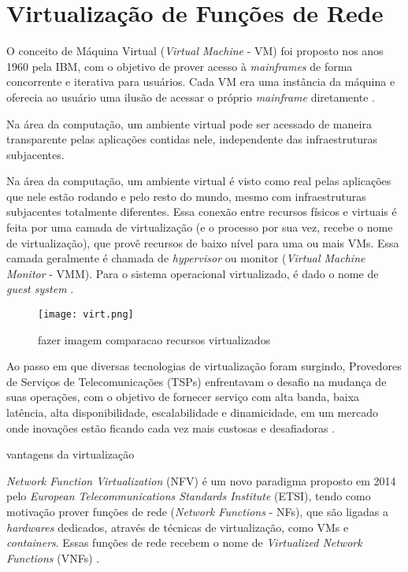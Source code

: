 \section{Virtualização de Funções de Rede}
\label{nfv}

O conceito de Máquina Virtual (\textit{Virtual Machine} - VM) foi proposto nos anos 1960 pela IBM, com o objetivo de prover acesso à \textit{mainframes} de forma concorrente e iterativa para usuários. Cada VM era uma instância da máquina e oferecia ao usuário uma ilusão de acessar o próprio \textit{mainframe} diretamente \cite{nanda2005survey}.

Na área da computação, um ambiente virtual pode ser acessado de maneira transparente pelas aplicações contidas nele, independente das infraestruturas subjacentes.

Na área da computação, um ambiente virtual é visto como real pelas aplicações que nele estão rodando e pelo resto do mundo, mesmo com infraestruturas subjacentes totalmente diferentes. Essa conexão entre recursos físicos e virtuais é feita por uma camada de virtualização (e o processo por sua vez, recebe o nome de virtualização), que provê recursos de baixo nível para uma ou mais VMs. Essa camada geralmente é chamada de \textit{hypervisor} ou monitor (\textit{Virtual Machine Monitor} - VMM). Para o sistema operacional virtualizado, é dado o nome de \textit{guest system} \cite[p.~438]{maziero2020}.

\begin{figure}[h]
    \centering
    \texttt{[image: virt.png]}
    \caption{fazer imagem comparacao recursos virtualizados}
    \label{fig:enter-label}
\end{figure}

Ao passo em que diversas tecnologias de virtualização foram surgindo, Provedores de Serviços de Telecomunicações (TSPs) enfrentavam o desafio na mudança de suas operações, com o objetivo de fornecer serviço com alta banda, baixa latência, alta disponibilidade, escalabilidade e dinamicidade, em um mercado onde inovações estão ficando cada vez mais custosas e desafiadoras \cite{Han2015} \cite{Wu2015}.

vantagens da virtualização

%
\textit{Network Function Virtualization} (NFV) é um novo paradigma proposto em 2014 pelo \textit{European Telecommunications Standards Institute} (ETSI), tendo como motivação prover funções de rede (\textit{Network Functions} - NFs), que são ligadas a \textit{hardwares} dedicados, através de técnicas de virtualização, como VMs e \textit{containers}. Essas funções de rede recebem o nome de \textit{Virtualized Network Functions} (VNFs) \citep[p.~8]{nfv_whitepaper}. 

